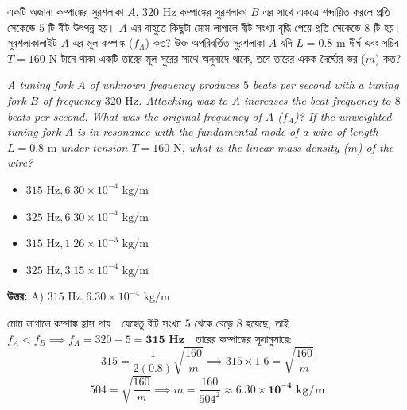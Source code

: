 \documentclass[12pt, a4paper]{article}
\begin{document}
\vspace{2em}

\begin{tcolorbox}[questionbox={প্রশ্ন (Question) 24}]
    \noindent
    একটি অজানা কম্পাঙ্কের সুরশলাকা $A$, $320\text{ Hz}$ কম্পাঙ্কের সুরশলাকা $B$ এর সাথে একত্রে শব্দায়িত করলে প্রতি সেকেন্ডে $5$ টি বীট উৎপন্ন হয়। $A$ এর বাহুতে কিছুটা মোম লাগালে বীট সংখ্যা বৃদ্ধি পেয়ে প্রতি সেকেন্ডে $8$ টি হয়। সুরশলাকালাইট $A$ এর মূল কম্পাঙ্ক ($f_A$) কত? উক্ত অপরিবর্তিত সুরশলাকা $A$ যদি $L = 0.8\text{ m}$ দীর্ঘ এবং সচিব $T = 160\text{ N}$ টানে থাকা একটি তারের মূল সুরের সাথে অনুনাদে থাকে, তবে তারের একক দৈর্ঘ্যের ভর ($m$) কত?
    
    \vspace{0.8em}
    \begin{english}
    \noindent\textit{\color{darkgray}
    A tuning fork $A$ of unknown frequency produces $5$ beats per second with a tuning fork $B$ of frequency $320\text{ Hz}$. Attaching wax to $A$ increases the beat frequency to $8$ beats per second. What was the original frequency of $A$ ($f_A$)? If the unweighted tuning fork $A$ is in resonance with the fundamental mode of a wire of length $L = 0.8\text{ m}$ under tension $T = 160\text{ N}$, what is the linear mass density ($m$) of the wire?
    }
    \end{english}
\end{tcolorbox}

\begin{itemize}[label={}, leftmargin=1cm, itemsep=0.5em]
    \item[\textbf{A)}] $315\text{ Hz}, 6.30 \times 10^{-4}\text{ kg/m}$
    \item[\textbf{B)}] $325\text{ Hz}, 6.30 \times 10^{-4}\text{ kg/m}$
    \item[\textbf{C)}] $315\text{ Hz}, 1.26 \times 10^{-3}\text{ kg/m}$
    \item[\textbf{D)}] $325\text{ Hz}, 3.15 \times 10^{-4}\text{ kg/m}$
\end{itemize}

\vspace{0.5em}
\begin{tcolorbox}[answerbox]
    \textbf{\color{success} উত্তর:} A) $315\text{ Hz}, 6.30 \times 10^{-4}\text{ kg/m}$
\end{tcolorbox}
\vspace{1em}

\begin{tcolorbox}[solutionbox={সমাধান (Solution)}]
    \noindent
    মোম লাগালে কম্পাঙ্ক হ্রাস পায়। যেহেতু বীট সংখ্যা $5$ থেকে বেড়ে $8$ হয়েছে, তাই $f_A < f_B \implies f_A = 320 - 5 = \mathbf{315\text{ Hz}}$। তারের কম্পাঙ্কের সূত্রানুসারে:
    \[ 315 = \frac{1}{2(0.8)}\sqrt{\frac{160}{m}} \implies 315 \times 1.6 = \sqrt{\frac{160}{m}} \]
    \[ 504 = \sqrt{\frac{160}{m}} \implies m = \frac{160}{504^2} \approx \mathbf{6.30 \times 10^{-4}\text{ kg/m}} \]
\end{tcolorbox}
\end{document}
